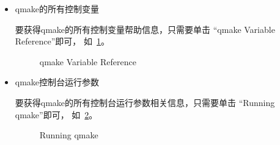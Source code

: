 \begin{itemize}

\item qmake的所有控制变量

要获得qmake的所有控制变量帮助信息，只需要单击
“qmake Variable Reference”即可，
如\figurename\ \ref{p000003}。

\begin{figure}[htb] %
\marginnote{\setlength\fboxsep{2pt}\fbox{\footnotesize{\kaishu\figurename\,}\footnotesize{\ref{p000003}}}}\centering %
\setlength\fboxsep{-1pt} %
\caption{qmake Variable Reference} %
\label{p000003} %
\end{figure}


\item qmake控制台运行参数

要获得qmake的所有控制台运行参数相关信息，只需要单击
“Running qmake”即可，
如\figurename\ \ref{p000004}。
\begin{figure}[htb] %
\marginnote{\setlength\fboxsep{2pt}\fbox{\footnotesize{\kaishu\figurename\,}\footnotesize{\ref{p000004}}}}\centering %
\setlength\fboxsep{-1pt} %
\caption{Running qmake} %
\label{p000004} %
\end{figure}



\end{itemize}
